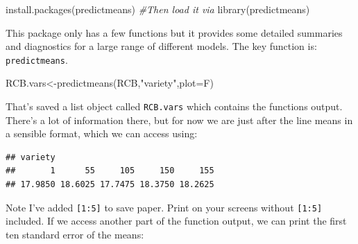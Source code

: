 \documentclass[
]{book}
\newenvironment{Shaded}{\begin{snugshade}}{\end{snugshade}}
\newcommand{\AttributeTok}[1]{\textcolor[rgb]{0.77,0.63,0.00}{#1}}
\newcommand{\CommentTok}[1]{\textcolor[rgb]{0.56,0.35,0.01}{\textit{#1}}}
\newcommand{\DecValTok}[1]{\textcolor[rgb]{0.00,0.00,0.81}{#1}}
\newcommand{\FunctionTok}[1]{\textcolor[rgb]{0.00,0.00,0.00}{#1}}
\newcommand{\NormalTok}[1]{#1}
\newcommand{\OtherTok}[1]{\textcolor[rgb]{0.56,0.35,0.01}{#1}}
\newcommand{\SpecialCharTok}[1]{\textcolor[rgb]{0.00,0.00,0.00}{#1}}
\newcommand{\StringTok}[1]{\textcolor[rgb]{0.31,0.60,0.02}{#1}}
\begin{document}
\begin{Shaded}
\begin{Highlighting}[]
\FunctionTok{install.packages}\NormalTok{(}\StringTok{\textquotesingle{}predictmeans\textquotesingle{}}\NormalTok{)}
\CommentTok{\#Then load it via}
\FunctionTok{library}\NormalTok{(predictmeans)}
\end{Highlighting}
\end{Shaded}

This package only has a few functions but it provides some detailed summaries and diagnostics for a large range of different models. The key function is: \texttt{predictmeans}.

\begin{Shaded}
\begin{Highlighting}[]
\NormalTok{RCB.vars}\OtherTok{\textless{}{-}}\FunctionTok{predictmeans}\NormalTok{(RCB,}\StringTok{"variety"}\NormalTok{,}\AttributeTok{plot=}\NormalTok{F)}
\end{Highlighting}
\end{Shaded}

That's saved a list object called \texttt{RCB.vars} which contains the functions output. There's a lot of information there, but for now we are just after the line means in a sensible format, which we can access using:

\begin{Shaded}
\end{Shaded}

\begin{verbatim}
## variety
##       1      55     105     150     155 
## 17.9850 18.6025 17.7475 18.3750 18.2625
\end{verbatim}

Note I've added \texttt{{[}1:5{]}} to save paper. Print on your screens without \texttt{{[}1:5{]}} included. If we access another part of the function output, we can print the first ten standard error of the means:

\begin{Shaded}
\end{Shaded}
\end{document}
